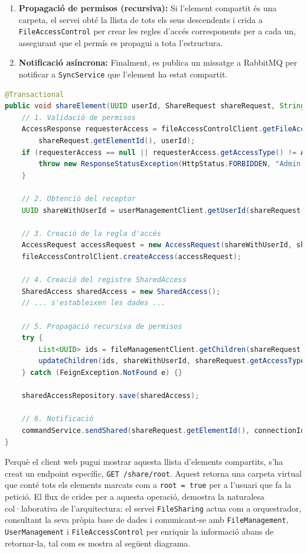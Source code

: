 \begin{enumerate}
    \item \textbf{Propagació de permisos (recursiva):} Si l'element compartit és una carpeta, el servei obté la llista de tots els seus descendents i crida a \texttt{FileAccessControl} per crear les regles d'accés corresponents per a cada un, assegurant que el permís es propagui a tota l'estructura.
    \item \textbf{Notificació asíncrona:} Finalment, es publica un missatge a RabbitMQ per notificar a \texttt{SyncService} que l'element ha estat compartit.
\end{enumerate}

\begin{lstlisting}[language=Java, caption={Lògica principal per compartir un element a `FileSharingService`}]
@Transactional
public void shareElement(UUID userId, ShareRequest shareRequest, String connectionId) {
    // 1. Validació de permisos
    AccessResponse requesterAccess = fileAccessControlClient.getFileAccess(
        shareRequest.getElementId(), userId);
    if (requesterAccess == null || requesterAccess.getAccessType() != AccessType.ADMIN.ordinal()) {
        throw new ResponseStatusException(HttpStatus.FORBIDDEN, "Admin permission required...");
    }

    // 2. Obtenció del receptor
    UUID shareWithUserId = userManagementClient.getUserId(shareRequest.getUser());

    // 3. Creació de la regla d'accés
    AccessRequest accessRequest = new AccessRequest(shareWithUserId, shareRequest.getElementId(), shareRequest.getAccessType().ordinal());
    fileAccessControlClient.createAccess(accessRequest);
    
    // 4. Creació del registre SharedAccess
    SharedAccess sharedAccess = new SharedAccess();
    // ... s'estableixen les dades ...
    
    // 5. Propagació recursiva de permisos
    try {
        List<UUID> ids = fileManagementClient.getChildren(shareRequest.getElementId());
        updateChildren(ids, shareWithUserId, shareRequest.getAccessType().ordinal());
    } catch (FeignException.NotFound e) {}

    sharedAccessRepository.save(sharedAccess);
    
    // 6. Notificació
    commandService.sendShared(shareRequest.getElementId(), connectionId, userId.toString(), parentIdString);
}
\end{lstlisting}

Perquè el client web pugui mostrar aquesta llista d'elements compartits, s'ha creat un endpoint específic, \texttt{GET /share/root}. Aquest retorna una carpeta virtual que conté tots els elements marcats com a \texttt{root = true} per a l'usuari que fa la petició. El flux de crides per a aquesta operació, demostra la naturalesa col·laborativa de l'arquitectura: el servei \texttt{FileSharing} actua com a orquestrador, consultant la seva pròpia base de dades i comunicant-se amb \texttt{FileManagement}, \texttt{UserManagement} i \texttt{FileAccessControl} per enriquir la informació abans de retornar-la, tal com es mostra al següent diagrama.

